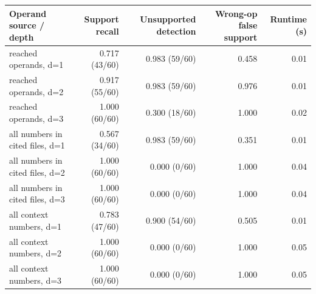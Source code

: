 \begin{tabular}{lrrrr}
\toprule
Operand source / depth & Support recall & Unsupported detection & Wrong-op false support & Runtime (s) \\
\midrule
reached operands, d=1 & 0.717 (43/60) & 0.983 (59/60) & 0.458 & 0.01 \\
reached operands, d=2 & 0.917 (55/60) & 0.983 (59/60) & 0.976 & 0.01 \\
reached operands, d=3 & 1.000 (60/60) & 0.300 (18/60) & 1.000 & 0.02 \\
all numbers in cited files, d=1 & 0.567 (34/60) & 0.983 (59/60) & 0.351 & 0.01 \\
all numbers in cited files, d=2 & 1.000 (60/60) & 0.000 (0/60) & 1.000 & 0.04 \\
all numbers in cited files, d=3 & 1.000 (60/60) & 0.000 (0/60) & 1.000 & 0.04 \\
all context numbers, d=1 & 0.783 (47/60) & 0.900 (54/60) & 0.505 & 0.01 \\
all context numbers, d=2 & 1.000 (60/60) & 0.000 (0/60) & 1.000 & 0.05 \\
all context numbers, d=3 & 1.000 (60/60) & 0.000 (0/60) & 1.000 & 0.05 \\
\bottomrule
\end{tabular}
